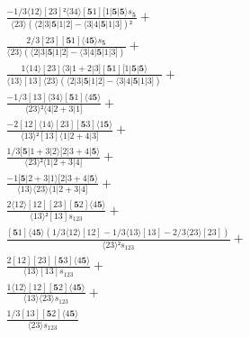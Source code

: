 \documentclass[varwidth, border=5pt]{standalone}
\begin{document}
\begin{my}
$\begin{gathered}
\scriptscriptstyle\frac{-1/3⟨12⟩[23]²⟨34⟩[𝟓1][1|𝟓|𝟓⟩s_{𝟓}}{⟨23⟩(⟨2|3|𝟓|1|2]-⟨3|4|𝟓|1|3])²} +\\
\scriptscriptstyle\frac{2/3[23][𝟓1]⟨4𝟓⟩s_{𝟓}}{⟨23⟩(⟨2|3|𝟓|1|2]-⟨3|4|𝟓|1|3])} +\\
\scriptscriptstyle\frac{1⟨14⟩[23]⟨3|1+2|3][𝟓1][1|𝟓|𝟓⟩}{⟨13⟩[13]⟨23⟩(⟨2|3|𝟓|1|2]-⟨3|4|𝟓|1|3])} +\\
\scriptscriptstyle\frac{-1/3[13]⟨34⟩[𝟓1]⟨4𝟓⟩}{⟨23⟩²⟨4|2+3|1]} +\\
\scriptscriptstyle\frac{-2[12]⟨14⟩[23][𝟓3]⟨1𝟓⟩}{⟨13⟩²[13]⟨1|2+4|3]} +\\
\scriptscriptstyle\frac{1/3[𝟓|1+3|2⟩[2|3+4|𝟓⟩}{⟨23⟩²⟨1|2+3|4]} +\\
\scriptscriptstyle\frac{-1[𝟓|2+3|1⟩[2|3+4|𝟓⟩}{⟨13⟩⟨23⟩⟨1|2+3|4]} +\\
\scriptscriptstyle\frac{2⟨12⟩[12][23][𝟓2]⟨4𝟓⟩}{⟨13⟩²[13]s_{123}} +\\
\scriptscriptstyle\frac{[𝟓1]⟨4𝟓⟩(1/3⟨12⟩[12]-1/3⟨13⟩[13]-2/3⟨23⟩[23])}{⟨23⟩²s_{123}} +\\
\scriptscriptstyle\frac{2[12][23][𝟓3]⟨4𝟓⟩}{⟨13⟩[13]s_{123}} +\\
\scriptscriptstyle\frac{1⟨12⟩[12][𝟓2]⟨4𝟓⟩}{⟨13⟩⟨23⟩s_{123}} +\\
\scriptscriptstyle\frac{1/3[13][𝟓2]⟨4𝟓⟩}{⟨23⟩s_{123}} \phantom{+}
\end{gathered}$
\end{my}
\end{document}
